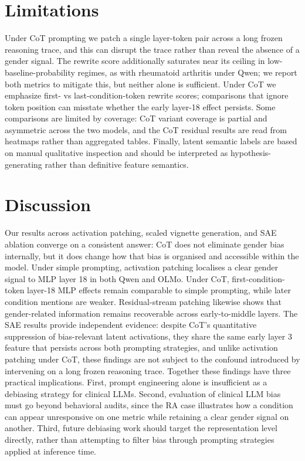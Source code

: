 \documentclass{article}
\begin{document}
\section{Limitations}
Under CoT prompting we patch a single layer-token pair across a long frozen reasoning trace, and this can disrupt the trace rather than reveal the absence of a gender signal. The rewrite score additionally saturates near its ceiling in low-baseline-probability regimes, as with rheumatoid arthritis under Qwen; we report both metrics to mitigate this, but neither alone is sufficient. Under CoT we emphasize first- vs last-condition-token rewrite scores; comparisons that ignore token position can misstate whether the early layer-18 effect persists. Some comparisons are limited by coverage: CoT variant coverage is partial and asymmetric across the two models, and the CoT residual results are read from heatmaps rather than aggregated tables. Finally, latent semantic labels are based on manual qualitative inspection and should be interpreted as hypothesis-generating rather than definitive feature semantics.

\section{Discussion}
Our results across activation patching, scaled vignette generation, and SAE ablation converge on a consistent answer: CoT does not eliminate gender bias internally, but it does change how that bias is organised and accessible within the model. Under simple prompting, activation patching localises a clear gender signal to MLP layer 18 in both Qwen and OLMo. Under CoT, first-condition-token layer-18 MLP effects remain comparable to simple prompting, while later condition mentions are weaker. Residual-stream patching likewise shows that gender-related information remains recoverable across early-to-middle layers. The SAE results provide independent evidence: despite CoT's quantitative suppression of bias-relevant latent activations, they share the same early layer 3 feature that persists across both prompting strategies, and unlike activation patching under CoT, these findings are not subject to the confound introduced by intervening on a long frozen reasoning trace. Together these findings have three practical implications. First, prompt engineering alone is insufficient as a debiasing strategy for clinical LLMs. Second, evaluation of clinical LLM bias must go beyond behavioral audits, since the RA case illustrates how a condition can appear unresponsive on one metric while retaining a clear gender signal on another. Third, future debiasing work should target the representation level directly, rather than attempting to filter bias through prompting strategies applied at inference time.
\end{document}
